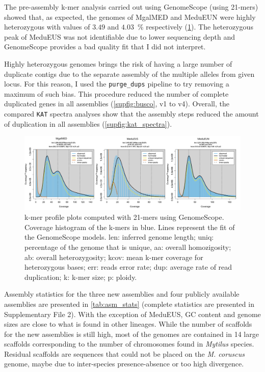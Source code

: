 \documentclass[11pt, a4paper]{article}
\begin{document}
The pre-assembly k-mer analysis carried out using GenomeScope (using 21-mers) showed that, as expected, the genomes of MgalMED and MeduEUN were highly heterozygous with values of $3.49$ and $4.03$~\% respectively (\cref{fig:genomescope}).
The heterozygous peak of MeduEUS was not identifiable due to lower sequencing depth and GenomeScope provides a bad quality fit that I did not interpret.

Highly heterozygous genomes brings the risk of having a large number of duplicate contigs due to the separate assembly of the multiple alleles from given locus.
For this reason, I used the \texttt{purge\_dups} pipeline to try removing a maximum of such bias.
This procedure reduced the number of complete duplicated genes in all assemblies (\cref{supfig:busco}, v1 to v4).
Overall, the compared \texttt{KAT} spectra analyses show that the assembly steps reduced the amount of duplication in all assemblies (\cref{supfig:kat_spectra}).

\begin{figure}[h]
	\includegraphics[width=\linewidth]{figures/Fig1_genomescope.pdf}
	\caption{k-mer profile plots computed with 21-mers using GenomeScope.
		Coverage histogram of the k-mers in blue.
		Lines represent the fit of the GenomeScope models.
		len: inferred genome length; uniq: percentage of the genome that is unique, aa: overall homozigosity; ab: overall heterozygosity; kcov: mean k-mer coverage for heterozygous bases; err: reads error rate; dup: average rate of read duplication; k: k-mer size; p: ploidy.
	}
	\label{fig:genomescope}
\end{figure}

Assembly statistics for the three new assemblies and four publicly available assemblies are presented in \cref{tab:asm_stats} (complete statistics are presented in Supplementary File 2).
With the exception of MeduEUS, GC content and genome sizes are close to what is found in other lineages.
While the number of scaffolds for the new assemblies is still high, most of the genomes are contained in 14 large scaffolds corresponding to the number of chromosomes found in \textit{Mytilus} species.
Residual scaffolds are sequences that could not be placed on the \textit{M. coruscus} genome,
maybe due to inter-species presence-absence or too high divergence.
\end{document}
